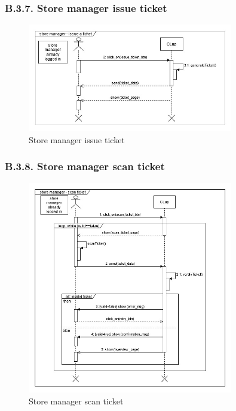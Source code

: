 \subsubsection{B.3.7. Store manager issue ticket}

\begin{figure}[H]
\centering
\includegraphics[width=0.8\textwidth]{sequence_diagrams/sequence_diagram_store_manager_issue_ticket}
\caption{Store manager issue ticket}
\end{figure}

\subsubsection{B.3.8. Store manager scan ticket}

\begin{figure}[H]
\centering
\includegraphics[width=0.8\textwidth]{sequence_diagrams/sequence_diagram_store_manager_scan_ticket}
\caption{Store manager scan ticket}
\end{figure}

